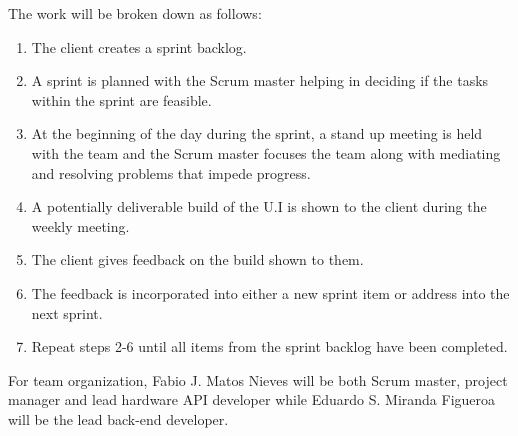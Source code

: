  The work will be broken down as follows:
 \begin{enumerate}
 \item The client creates a sprint backlog.
 \item A sprint is planned with the Scrum master helping in deciding if the tasks within the sprint are feasible.
 \item At the beginning of the day during the sprint, a stand up meeting is held with the team and the Scrum master focuses the team along with mediating and resolving problems that impede progress.
 \item A potentially deliverable build of the U.I is shown to the client during the weekly meeting.
 \item The client gives feedback on the build shown to them.
 \item The feedback is incorporated into either a new sprint item or address into the next sprint.
 \item Repeat steps 2-6 until all items from the sprint backlog have been completed.
 \end{enumerate}
 For team organization, Fabio J. Matos Nieves will be both Scrum master, project manager and lead hardware API developer while Eduardo S. Miranda Figueroa will be the lead back-end developer.